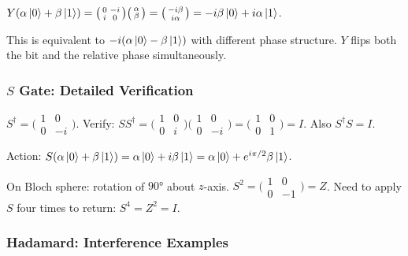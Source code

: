 \documentclass[10pt,a4paper]{article}
\begin{document}
$Y(\alpha\ket{0}+\beta\ket{1})=\bigl(\begin{smallmatrix}0&-i\\i&0\end{smallmatrix}\bigr)\bigl(\begin{smallmatrix}\alpha\\\beta\end{smallmatrix}\bigr)=\bigl(\begin{smallmatrix}-i\beta\\i\alpha\end{smallmatrix}\bigr)=-i\beta\ket{0}+i\alpha\ket{1}$.

This is equivalent to $-i(\alpha\ket{0}-\beta\ket{1})$ with different phase structure. $Y$ flips both the bit and the relative phase simultaneously.

\subsubsection*{$S$ Gate: Detailed Verification}

$S^\dagger=\bigl(\begin{smallmatrix}1&0\\0&-i\end{smallmatrix}\bigr)$. Verify: $SS^\dagger=\bigl(\begin{smallmatrix}1&0\\0&i\end{smallmatrix}\bigr)\bigl(\begin{smallmatrix}1&0\\0&-i\end{smallmatrix}\bigr)=\bigl(\begin{smallmatrix}1&0\\0&1\end{smallmatrix}\bigr)=I$. Also $S^\dagger S=I$.

Action: $S(\alpha\ket{0}+\beta\ket{1})=\alpha\ket{0}+i\beta\ket{1}=\alpha\ket{0}+e^{i\pi/2}\beta\ket{1}$.

On Bloch sphere: rotation of $90°$ about $z$-axis. $S^2=\bigl(\begin{smallmatrix}1&0\\0&-1\end{smallmatrix}\bigr)=Z$. Need to apply $S$ four times to return: $S^4=Z^2=I$.

\subsubsection*{Hadamard: Interference Examples}
\end{document}
